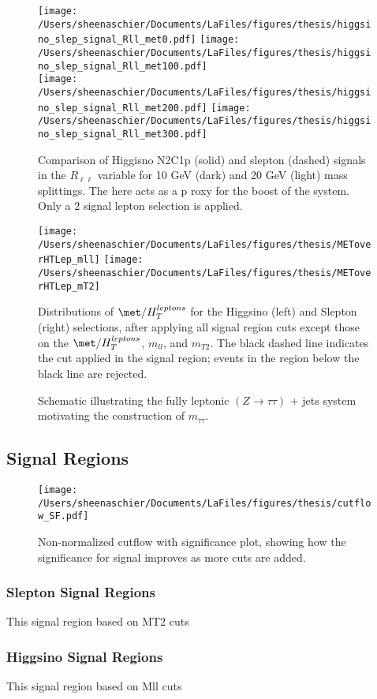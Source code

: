   \begin{figure}[tbp]
     \texttt{[image: /Users/sheenaschier/Documents/LaFiles/figures/thesis/higgsino\_slep\_signal\_Rll\_met0.pdf]}
       \texttt{[image: /Users/sheenaschier/Documents/LaFiles/figures/thesis/higgsino\_slep\_signal\_Rll\_met100.pdf]}\\
     \texttt{[image: /Users/sheenaschier/Documents/LaFiles/figures/thesis/higgsino\_slep\_signal\_Rll\_met200.pdf]}
     \texttt{[image: /Users/sheenaschier/Documents/LaFiles/figures/thesis/higgsino\_slep\_signal\_Rll\_met300.pdf]}\\
   \caption{Comparison of Higgisno N2C1p (solid) and slepton (dashed) signals in the $R_{\ell\ell}$ variable for 10 GeV (dark) and 20 GeV (light) mass splittings. The \met{} here acts as a p    roxy for the boost of the system. Only a 2 signal lepton selection is applied.}
   \label{fig:Rll_signals only}
 \end{figure}
 
 \begin{figure}[tbp]
  \centering
  \texttt{[image: /Users/sheenaschier/Documents/LaFiles/figures/thesis/METoverHTLep\_mll]}
  \texttt{[image: /Users/sheenaschier/Documents/LaFiles/figures/thesis/METoverHTLep\_mT2]}
 \caption{Distributions of $\met/H_{T}^{leptons}$ for the Higgsino (left) and Slepton (right) selections, after applying all signal region cuts except those on the $\met/H_{T}^{leptons}$, $m_{ll}$, and $m_{T2}$.  The black dashed line indicates the cut applied in the signal region; events in the region below the black line are rejected.}
 \label{fig:METoverHTLep2D}
 \end{figure}
 
 
  \begin{figure}
  \centering
  
  \caption{Schematic illustrating the fully leptonic $(Z\to\tau\tau)$ + jets system motivating the construction of $m_{\tau\tau}$. }
  \label{fig:ditau_schematic}
  \end{figure}
  \subsection{Signal Regions}
 \begin{figure}[h!]
 \centering
 \texttt{[image: /Users/sheenaschier/Documents/LaFiles/figures/thesis/cutflow\_SF.pdf]}
 \caption{Non-normalized cutflow with significance plot, showing how the significance for signal improves as more cuts are added.}
 \label{fig:cutflow_zn}
 \end{figure}
\subsubsection{Slepton Signal Regions}
This signal region based on MT2 cuts
\subsubsection{Higgsino Signal Regions}
This signal region based on Mll cuts



